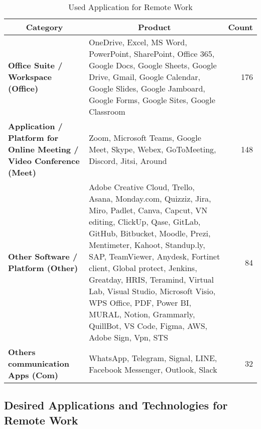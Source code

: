 \documentclass[a4paper, conference]{IEEEtran}
\begin{document}
\begin{table*}
	\caption{Used Application for Remote Work}
	\label{Used Application for Remote Work}
	\begin{tabular}{|p{}|p{}|r|}
		\hline
		\multicolumn{1}{|c|}{\textbf{Category}}                                            & \multicolumn{1}{c|}{\textbf{Product}}                                                 & \multicolumn{1}{c|}{\textbf{Count}} \\ \hline
		\textbf{Office Suite / Workspace (Office)} &
		OneDrive, Excel, MS Word, PowerPoint, SharePoint, Office 365, Google Docs, Google Sheets, Google Drive, Gmail, Google Calendar, Google Slides, Google Jamboard, Google Forms, Google Sites, Google Classroom & 176 %
		\\ \hline
		\textbf{Application / Platform for Online Meeting / Video Conference (Meet)} &
		Zoom, Microsoft Teams, Google Meet, Skype, Webex, GoToMeeting, Discord, Jitsi, Around & 148 %
		\\ \hline
		\textbf{Other Software / Platform (Other)} & Adobe Creative Cloud, Trello, Asana, Monday.com, Quizziz, Jira, Miro, Padlet, Canva, Capcut, VN editing, ClickUp, Qase, GitLab, GitHub, Bitbucket, Moodle, Prezi, Mentimeter, Kahoot, Standup.ly, SAP, TeamViewer, Anydesk, Fortinet client, Global protect, Jenkins, Greatday, HRIS, Teramind, Virtual Lab, Visual Studio, Microsoft Visio, WPS Office, PDF, Power BI, MURAL, Notion, Grammarly, QuillBot, VS Code, Figma, AWS, Adobe Sign, Vpn, STS & 84 %
		\\ \hline
		\textbf{Others communication Apps (Com)}                                        & WhatsApp, Telegram, Signal, LINE, Facebook Messenger, Outlook, Slack & 32 %
		\\ \hline
	\end{tabular}
\end{table*}


\subsection{Desired Applications and Technologies for Remote Work}
\label{sec:desired-apps}
\end{document}
